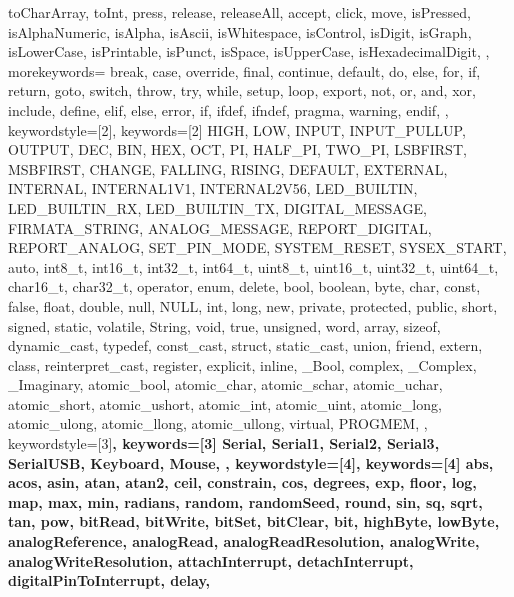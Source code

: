 {{			toCharArray, toInt, press, release, releaseAll, accept, click, move, 
			isPressed, isAlphaNumeric, isAlpha, isAscii, isWhitespace, isControl, 
			isDigit, isGraph, isLowerCase, isPrintable, isPunct, isSpace, 
			isUpperCase, isHexadecimalDigit, 
		}, 
		morekeywords={   %
			break, case, override, final, continue, default, do, else, for, 
			if, return, goto, switch, throw, try, while, setup, loop, export, 
			not, or, and, xor, include, define, elif, else, error, if, ifdef, 
			ifndef, pragma, warning, endif,
		}, 
		keywordstyle=[2]\color{arduinoBlue},   
		keywords=[2]{   %
			HIGH, LOW, INPUT, INPUT_PULLUP, OUTPUT, DEC, BIN, HEX, OCT, PI, 
			HALF_PI, TWO_PI, LSBFIRST, MSBFIRST, CHANGE, FALLING, RISING, 
			DEFAULT, EXTERNAL, INTERNAL, INTERNAL1V1, INTERNAL2V56, LED_BUILTIN, 
			LED_BUILTIN_RX, LED_BUILTIN_TX, DIGITAL_MESSAGE, FIRMATA_STRING, 
			ANALOG_MESSAGE, REPORT_DIGITAL, REPORT_ANALOG, SET_PIN_MODE, 
			SYSTEM_RESET, SYSEX_START, auto, int8_t, int16_t, int32_t, int64_t, 
			uint8_t, uint16_t, uint32_t, uint64_t, char16_t, char32_t, operator, 
			enum, delete, bool, boolean, byte, char, const, false, float, double, 
			null, NULL, int, long, new, private, protected, public, short, 
			signed, static, volatile, String, void, true, unsigned, word, array, 
			sizeof, dynamic_cast, typedef, const_cast, struct, static_cast, union, 
			friend, extern, class, reinterpret_cast, register, explicit, inline, 
			_Bool, complex, _Complex, _Imaginary, atomic_bool, atomic_char, 
			atomic_schar, atomic_uchar, atomic_short, atomic_ushort, atomic_int, 
			atomic_uint, atomic_long, atomic_ulong, atomic_llong, atomic_ullong, 
			virtual, PROGMEM,
		},  
		keywordstyle=[3]\bfseries\color{arduinoOrange},
		keywords=[3]{  %
			Serial, Serial1, Serial2, Serial3, SerialUSB, Keyboard, Mouse,
		},      
		keywordstyle=[4]\color{arduinoOrange},
		keywords=[4]{  %
			abs, acos, asin, atan, atan2, ceil, constrain, cos, degrees, exp, 
			floor, log, map, max, min, radians, random, randomSeed, round, sin, 
			sq, sqrt, tan, pow, bitRead, bitWrite, bitSet, bitClear, bit, 
			highByte, lowByte, analogReference, analogRead, 
			analogReadResolution, analogWrite, analogWriteResolution, 
			attachInterrupt, detachInterrupt, digitalPinToInterrupt, delay, 
}}

